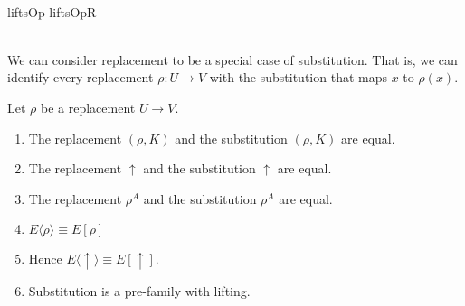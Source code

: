 \begin{code}%
\>  \<%
\\
%
\\
\>  \AgdaSymbol{(} \AgdaSymbol{:} \AgdaSymbol{)} \<%
\\
\>  \<%
\\
\>  \<%
\\
\>  \<%
\\
\>   \<%
\\
\>   \<%
\\
\>   \<%
\\
\>   \<%
\\
%
\\
\>    \AgdaSymbol{()}  \AgdaSymbol{(}liftsOp  liftsOpR\AgdaSymbol{)}\<%
\\
\>  \<%
\\
\>  \<%
\end{code}

We can consider replacement to be a special case of substitution.  That is,
we can identify every replacement $\rho : U \rightarrow V$ with the substitution
that maps $x$ to $\rho(x)$.  
\begin{lemma}
Let $\rho$ be a replacement $U \rightarrow V$.
\begin{enumerate}
\item
The replacement $(\rho , K)$ and the substitution $(\rho , K)$ are equal.
\item
The replacement $\uparrow$ and the substitution $\uparrow$ are equal.
\item
The replacement $\rho^A$ and the substitution $\rho^A$ are equal.
\item
$ E \langle \rho \rangle \equiv E [ \rho ] $
\item
Hence $ E \langle \uparrow \rangle \equiv E [ \uparrow ]$.
\item
Substitution is a pre-family with lifting.
\end{enumerate}
\end{lemma}

